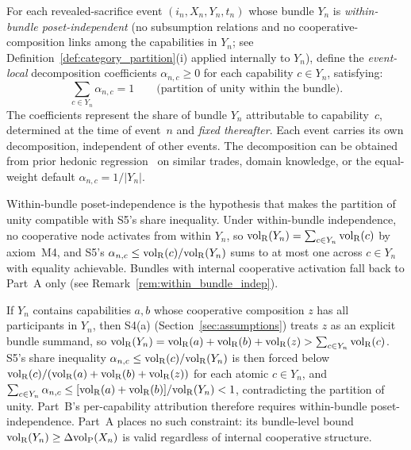 \begin{definition}
\label{def:bundle_decomp}
For each revealed-sacrifice event $(i_n, X_n, Y_n, t_n)$ whose
bundle $Y_n$ is \emph{within-bundle poset-independent} (no
subsumption relations and no cooperative-composition links among
the capabilities in $Y_n$; see
Definition~\ref{def:category_partition}(i) applied internally to
$Y_n$), define the \emph{event-local} decomposition coefficients
$\alpha_{n,c} \geq 0$ for each capability $c \in Y_n$, satisfying:
\[
  \sum_{c \in Y_n} \alpha_{n,c} = 1
  \qquad\text{(partition of unity within the bundle)}.
\]
The coefficients represent the share of bundle $Y_n$ attributable
to capability~$c$, determined at the time of event~$n$ and
\emph{fixed thereafter}.  Each event carries its own
decomposition, independent of other events.  The decomposition can
be obtained from prior hedonic
regression~\citep{rosen1974hedonic} on similar trades, domain
knowledge, or the equal-weight default
$\alpha_{n,c} = 1/|Y_n|$.

Within-bundle poset-independence is the hypothesis that makes
the partition of unity compatible with S5's share inequality.
Under within-bundle independence, no cooperative node activates
from within $Y_n$, so
${\operatorname{vol}_{\mathrm{R}}}(Y_n) = \sum_{c \in Y_n} {\operatorname{vol}_{\mathrm{R}}}(c)$ by axiom~M4, and S5's
$\alpha_{n,c} \leq {\operatorname{vol}_{\mathrm{R}}}(c)/{\operatorname{vol}_{\mathrm{R}}}(Y_n)$ sums to at most one
across $c \in Y_n$ with equality achievable.  Bundles with
internal cooperative activation fall back to Part~A only (see
Remark~\ref{rem:within_bundle_indep}).
\end{definition}

\begin{remark}
\label{rem:within_bundle_indep}
If $Y_n$ contains capabilities $a, b$ whose cooperative
composition $z$ has all participants in $Y_n$, then S4(a)
(Section~\ref{sec:assumptions}) treats $z$ as an explicit
bundle summand, so
${\operatorname{vol}_{\mathrm{R}}}(Y_n) = {\operatorname{vol}_{\mathrm{R}}}(a) + {\operatorname{vol}_{\mathrm{R}}}(b) + {\operatorname{vol}_{\mathrm{R}}}(z) > \sum_{c \in Y_n}
{\operatorname{vol}_{\mathrm{R}}}(c)$.  S5's share inequality $\alpha_{n,c} \leq
{\operatorname{vol}_{\mathrm{R}}}(c)/{\operatorname{vol}_{\mathrm{R}}}(Y_n)$ is then forced below ${\operatorname{vol}_{\mathrm{R}}}(c)/({\operatorname{vol}_{\mathrm{R}}}(a) +
{\operatorname{vol}_{\mathrm{R}}}(b) + {\operatorname{vol}_{\mathrm{R}}}(z))$ for each atomic $c \in Y_n$, and
$\sum_{c \in Y_n} \alpha_{n,c} \leq [{\operatorname{vol}_{\mathrm{R}}}(a) +
{\operatorname{vol}_{\mathrm{R}}}(b)]/{\operatorname{vol}_{\mathrm{R}}}(Y_n) < 1$, contradicting the partition of
unity.  Part~B's per-capability attribution therefore requires
within-bundle poset-independence.  Part~A places no such
constraint: its bundle-level bound ${\operatorname{vol}_{\mathrm{R}}}(Y_n) \geq
\Delta{\operatorname{vol}_{\mathrm{P}}}(X_n)$ is valid regardless of internal cooperative
structure.
\end{remark}

